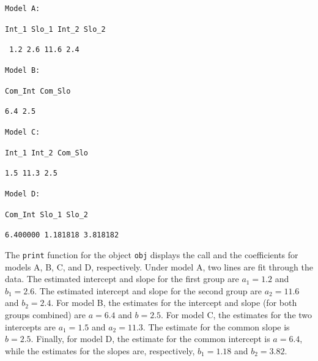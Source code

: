 \documentclass[11pt, oneside]{article}   	%
\begin{document}
\noindent \texttt{Model A:}

\noindent \texttt{Int\_1 Slo\_1 Int\_2 Slo\_2} 

\noindent \texttt{ \hspace{1mm}1.2   \hspace{ 2 mm}  2.6  \hspace{1 mm}11.6   \hspace{ 2 mm}        2.4} 

\noindent \vspace{1 mm}

\noindent \texttt{Model B:}

\noindent \texttt{Com\_Int Com\_Slo} 

\noindent \texttt{\hspace{7 mm}6.4  \hspace{6 mm}   2.5} 

\vspace{3 mm}

\noindent \texttt{Model C:}

\noindent \texttt{Int\_1   Int\_2 Com\_Slo}
 
\noindent \texttt{\hspace{3.5 mm}1.5 \hspace{1.5 mm}11.3   \hspace{5 mm}  2.5} 

\vspace{3 mm}

\noindent \texttt{Model D:}

\noindent \texttt{\hspace{3 mm}Com\_Int  \hspace{4.5 mm}  Slo\_1 \hspace{4.5 mm}   Slo\_2}

\noindent \texttt{6.400000 1.181818 3.818182}

\vspace{4 mm}

\noindent The \texttt{print} function for the object \texttt{obj} displays the call and the coefficients for models A, B, C, and D, respectively.  Under model A, two lines are fit through the data.  The estimated intercept and slope for the first group are $ a_{1} = 1.2  $ and $ b_{1} = 2.6  $.  The estimated intercept and slope for the second group are $  a_{2} = 11.6 $ and $ b_{2} = 2.4  $.  For model B, the estimates for the intercept and slope (for both groups combined) are $  a = 6.4  $ and $ b = 2.5  $.  For model C, the estimates for the two intercepts are $  a_{1} = 1.5 $ and $ a_{2} = 11.3  $.  The estimate for the common slope is $ b = 2.5  $.  Finally, for model D, the estimate for the common intercept is $  a = 6.4 $, while the estimates for the slopes are, respectively, $ b_{1} = 1.18  $ and $ b_{2} = 3.82  $. 
\end{document}
